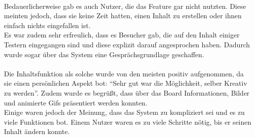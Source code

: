 \\
Bedauerlicherweise gab es auch Nutzer, die das Feature gar nicht nutzten.
Diese meinten jedoch, dass sie keine Zeit hatten, einen Inhalt zu erstellen oder ihnen einfach nichts eingefallen ist.
\\
Es war zudem sehr erfreulich, dass es Besucher gab, die auf den Inhalt einiger Testern eingegangen sind und diese explizit darauf angesprochen haben.
Dadurch wurde sogar über das System eine Gesprächsgrundlage geschaffen.
\\
\\
Die Inhaltsfunktion als solche wurde von den meisten positiv aufgenommen, da sie einen persönlichen Aspekt bot: ``Sehr gut war die Möglichkeit, selber Kreativ zu werden''.
Zudem wurde es begrüßt, dass über das Board Informationen, Bilder und animierte Gifs präsentiert werden konnten.
\\
Einige waren jedoch der Meinung, dass das System zu kompliziert sei und es zu viele Funktionen bot.
Einem Nutzer waren es zu viele Schritte nötig, bis er seinen Inhalt ändern konnte.





